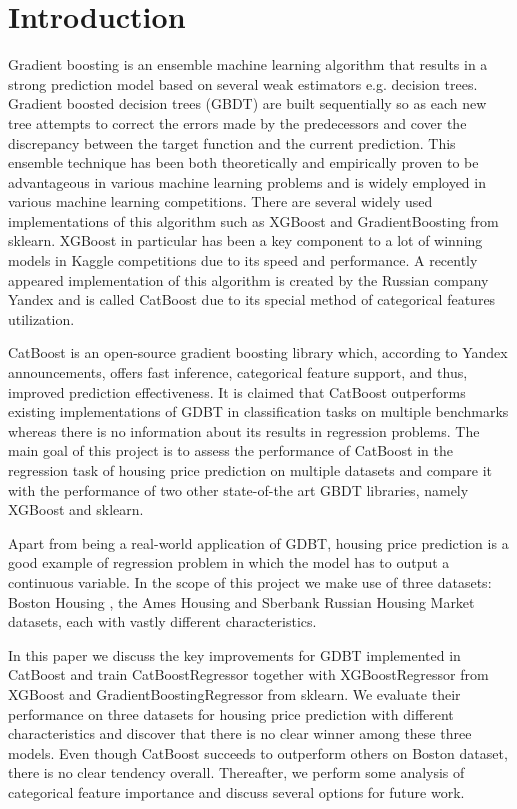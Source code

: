 \section{Introduction}
\label{sec:introduction}

Gradient boosting is an ensemble machine learning algorithm that results in a strong prediction model based on several weak estimators e.g. decision trees. Gradient boosted decision trees (GBDT) are built sequentially so as each new tree attempts to correct the errors made by the predecessors and cover the discrepancy between the target function and the current prediction. This ensemble technique has been both theoretically and empirically proven to be advantageous in various machine learning problems and is widely employed in various machine learning competitions. There are several widely used implementations of this algorithm such as XGBoost and GradientBoosting from sklearn. XGBoost in particular has been a key component to a lot of winning models in Kaggle competitions due to its speed and performance. A recently appeared implementation of this algorithm is created by the Russian company Yandex and is called CatBoost due to its special method of categorical features utilization.

CatBoost is an open-source gradient boosting library which, according to Yandex announcements, offers fast inference, categorical feature support, and thus, improved prediction effectiveness. It is claimed that CatBoost outperforms existing implementations of GDBT in classification tasks on multiple benchmarks \cite{catboost2017yandex} whereas there is no information about its results in regression problems. The main goal of this project is to assess the performance of CatBoost in the regression task of housing price prediction on multiple datasets and compare it with the performance of two other state-of-the art GBDT libraries, namely XGBoost and sklearn.

Apart from being a real-world application of GDBT, housing price prediction is a good example of regression problem in which the model has to output a continuous variable. In the scope of this project we make use of three datasets: Boston Housing \cite{boston1978housing}, the Ames Housing \cite{de2011ames} and Sberbank Russian Housing Market \cite{sberbank2017housing} datasets, each with vastly different characteristics.

In this paper we discuss the key improvements for GDBT implemented in CatBoost and train CatBoostRegressor together with XGBoostRegressor from XGBoost and GradientBoostingRegressor from sklearn. We evaluate their performance on three datasets for housing price prediction with different characteristics and discover that there is no clear winner among these three models. Even though CatBoost succeeds to outperform others on Boston dataset, there is no clear tendency overall. Thereafter, we perform some analysis of categorical feature importance and discuss several options for future work.

